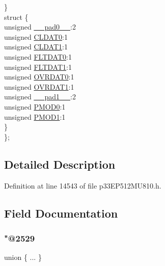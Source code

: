 \begin{DoxyCompactItemize}
\begin{tabbing}
\>\} \\
\>struct \{\\
\>\>unsigned \hyperlink{structtag_i_o_c_o_n3_b_i_t_s_adf71f3d8410c1f1dbbc96680a92c49af}{\_\_pad0\_\_}:2\\
\>\>unsigned \hyperlink{structtag_i_o_c_o_n3_b_i_t_s_a524fe5d7c4f19a9e5bab6fdae8cb6113}{CLDAT0}:1\\
\>\>unsigned \hyperlink{structtag_i_o_c_o_n3_b_i_t_s_abd730465de1cbb6fd169fef4c9f97b9e}{CLDAT1}:1\\
\>\>unsigned \hyperlink{structtag_i_o_c_o_n3_b_i_t_s_a154c32b551ecc420f476def330e87abd}{FLTDAT0}:1\\
\>\>unsigned \hyperlink{structtag_i_o_c_o_n3_b_i_t_s_a76d169f1247080fb508c7b31f62e89ab}{FLTDAT1}:1\\
\>\>unsigned \hyperlink{structtag_i_o_c_o_n3_b_i_t_s_a45d53d0768dd2659f98447ad77cc91b1}{OVRDAT0}:1\\
\>\>unsigned \hyperlink{structtag_i_o_c_o_n3_b_i_t_s_a095c02d71ec41de4ed9985a86207253f}{OVRDAT1}:1\\
\>\>unsigned \hyperlink{structtag_i_o_c_o_n3_b_i_t_s_acaf2d0924a107ec6e8d2e31febaf66f9}{\_\_pad1\_\_}:2\\
\>\>unsigned \hyperlink{structtag_i_o_c_o_n3_b_i_t_s_ac125b1e88bd44f7f044dcb0185cfb781}{PMOD0}:1\\
\>\>unsigned \hyperlink{structtag_i_o_c_o_n3_b_i_t_s_a961c1af920bb390a3b4ff925e45fa059}{PMOD1}:1\\
\>\} \\
\}; \\

\end{tabbing}\end{DoxyCompactItemize}


\subsection{Detailed Description}


Definition at line 14543 of file p33\+E\+P512\+M\+U810.\+h.



\subsection{Field Documentation}
\mbox{\label{structtag_i_o_c_o_n3_b_i_t_s_a6bcb3e4bc206d78428dcb6dfb6c627d6}} 
\subsubsection{\texorpdfstring{"@2529}{@2529}}
{\footnotesize\ttfamily union \{ ... \} }

